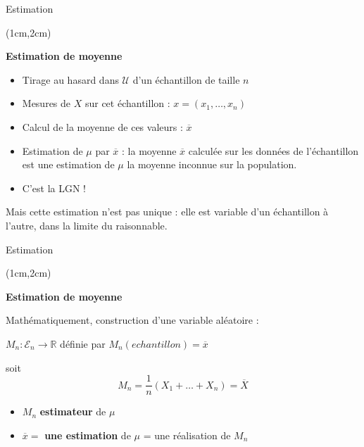 \documentclass{beamer}
\newcommand{\pop}{\mathcal{U}} %
\begin{document}
\begin{frame}{Estimation}
\begin{textblock*}{\textwidth}(1cm,2cm)

\begin{center}{\bf \Large Estimation de moyenne} \end{center}

\begin{itemize}
\item Tirage au hasard dans $\pop$ d'un échantillon de taille $n$
\item Mesures de $X$ sur cet échantillon : $x=(x_1,\hdots, x_n)$
\item Calcul de la moyenne de ces valeurs : $\overline{x}$
\item Estimation de $\mu$ par $\overline{x}$ : la moyenne $\overline{x}$ calculée sur les données de l'échantillon est une estimation de $\mu$ la moyenne inconnue sur la population. 
\item C'est la LGN !
\end{itemize}
Mais cette estimation n'est pas unique : elle est variable d'un échantillon à l'autre, dans la limite du raisonnable.


 \end{textblock*}

\end{frame}

 

\begin{frame}{Estimation}
\begin{textblock*}{\textwidth}(1cm,2cm)

\begin{center}{\bf \Large Estimation de moyenne} \end{center}

Mathématiquement, construction d'une variable aléatoire :

\begin{center}
$M_n : \mathcal{E}_n \longrightarrow \mathbb{R}$  définie par $M_n(echantillon) =  \overline{x} $
\end{center} 
soit 
\[
M_n = \frac{1}{n} (X_1 + \hdots + X_n)=\overline{X}
\]


\begin{itemize}
\item $M_n$ {\bf estimateur} de $\mu$
\item $\overline{x}=$  {\bf une estimation} de $\mu$ = une réalisation de $M_n$
\end{itemize}

\end{textblock*}

\end{frame}
\end{document}
